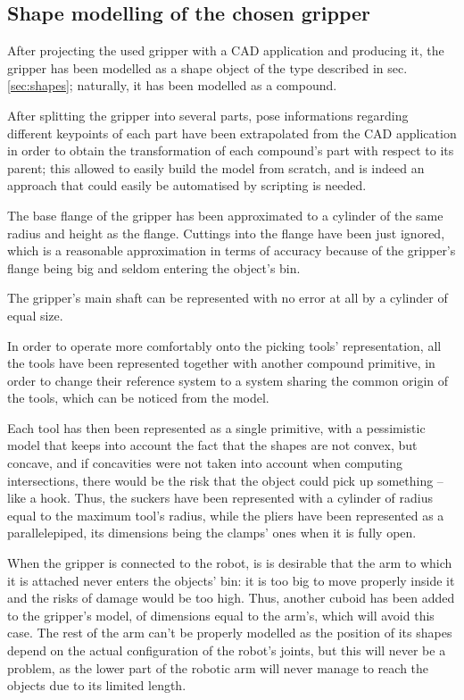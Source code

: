\subsection{Shape modelling of the chosen gripper}
After projecting the used gripper with a CAD application and producing it, the
gripper has been modelled as a shape object of the type described in sec.
\ref{sec:shapes}; naturally, it has been modelled as a compound.

After splitting the gripper into several parts, pose informations regarding
different keypoints of each part have been
extrapolated from the CAD application in order to obtain the transformation of
each compound's part with respect to its parent; this allowed to easily build
the model from scratch, and is indeed an approach that could easily be automatised by
scripting is needed.

The base flange of the gripper has been approximated to a cylinder of the same
radius and height as the flange. Cuttings into the flange have been just
ignored, which is a reasonable approximation in terms of accuracy because 
of the gripper's flange being big and seldom entering the object's bin.

The gripper's main shaft can be represented with no error at all by a cylinder
of equal size.

In order to operate more comfortably onto the picking tools' representation,
all the tools have been represented together with another compound primitive,
in order to change their reference system to a system sharing the common origin
of the tools, which can be noticed from the model.

Each tool has then been represented as a single primitive, with a pessimistic
model that  
keeps into account the fact that the shapes are not convex, but concave, and if
concavities were not taken into account when computing intersections, there
would be the risk that the object could pick up something -- like a hook. Thus,
the suckers have been represented with a cylinder of radius equal to the maximum
tool's radius, while the pliers have been represented as a parallelepiped, its
dimensions being the clamps' ones when it is fully open.

When the gripper is connected to the robot, is is desirable that the arm to
which it is attached never enters the objects' bin: it is too big to move
properly inside it and the risks of damage would be too high. Thus, another
cuboid has been added to the gripper's model, of dimensions equal to the arm's,
which will avoid this case. The rest of the arm can't be properly modelled as
the position of its shapes depend on the actual configuration of the robot's
joints, but this will never be a problem, as the lower part of the robotic arm
will never manage to reach the objects due to its limited length.

